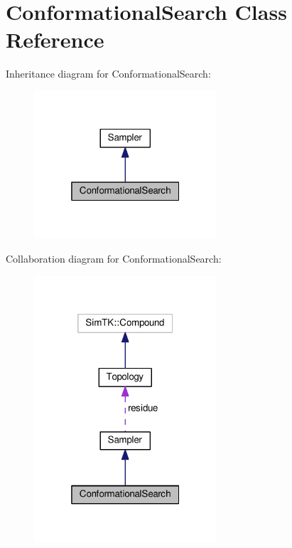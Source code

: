 \hypertarget{classConformationalSearch}{}\section{Conformational\+Search Class Reference}
\label{classConformationalSearch}


Inheritance diagram for Conformational\+Search\+:\nopagebreak
\begin{figure}[H]
\begin{center}
\leavevmode
\includegraphics[width=193pt]{classConformationalSearch__inherit__graph}
\end{center}
\end{figure}


Collaboration diagram for Conformational\+Search\+:\nopagebreak
\begin{figure}[H]
\begin{center}
\leavevmode
\includegraphics[width=193pt]{classConformationalSearch__coll__graph}
\end{center}
\end{figure}
